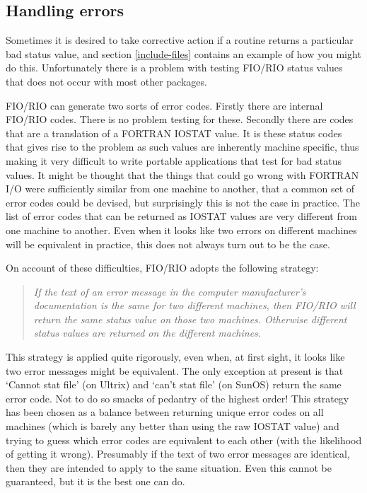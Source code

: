 \subsection{Handling errors}

Sometimes it is desired to take corrective action if a routine returns a
particular bad status value, and section \ref{include-files} contains an
example of how you might do this. Unfortunately there is a problem with testing
FIO/RIO status values that does not occur with most other packages.

FIO/RIO can generate two sorts of error codes. Firstly there are internal
FIO/RIO codes. There is no problem testing for these. Secondly there are codes
that are a translation of a FORTRAN IOSTAT value. It is these status codes that
gives rise to the problem as such values are inherently machine specific, thus
making it very difficult to write portable applications that test for bad
status values. It might be thought that the things that could go wrong with
FORTRAN I/O were sufficiently similar from one machine to another, that a
common set of error codes could be devised, but surprisingly this is not the
case in practice. The list of error codes that can be returned as IOSTAT values
are very different from one machine to another. Even when it looks like two
errors on different machines will be equivalent in practice, this does not
always turn out to be the case.

On account of these difficulties, FIO/RIO adopts the following strategy:

\begin{quote}{\it
If the text of an error message in the computer manufacturer's documentation is
the same for two different machines, then FIO/RIO will return the same status
value on those two machines. Otherwise different status values are returned on
the different machines.
}
\end{quote}

This strategy is applied quite rigorously, even when, at first sight, it looks
like two error messages might be equivalent. The only exception at present is
that `Cannot stat file' (on Ultrix) and `can't stat file' (on SunOS) return the
same error code. Not to do so smacks of pedantry of the highest order! This
strategy has been chosen as a balance between returning unique error codes on
all machines (which is barely any better than using the raw IOSTAT value) and
trying to guess which error codes are equivalent to each other (with the
likelihood of getting it wrong). Presumably if the text of two error messages
are identical, then they are intended to apply to the same situation. Even this
cannot be guaranteed, but it is the best one can do.


